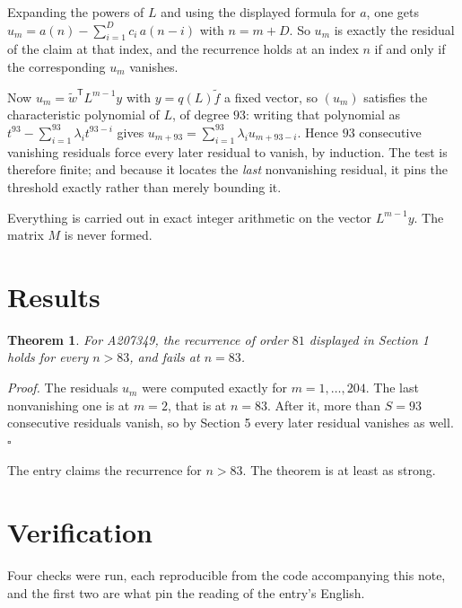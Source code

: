 \documentclass[11pt]{article}
\newtheorem{theorem}{Theorem}
\theoremstyle{definition}
\begin{document}
Expanding the powers of $L$ and using the displayed formula for $a$, one gets $u_m = a(n) - \sum_{i=1}^{D} c_i\,a(n-i)$ with $n = m + D$. So $u_m$ is exactly the residual of the claim at that index, and the recurrence holds at an index $n$ if and only if the corresponding $u_m$ vanishes.

Now $u_m = \tilde w^{\mathsf T} L^{m-1} y$ with $y = q(L)\tilde f$ a fixed vector, so $(u_m)$ satisfies the characteristic polynomial of $L$, of degree $93$: writing that polynomial as $t^{93} - \sum_{i=1}^{93} \lambda_i t^{93-i}$ gives $u_{m+93} = \sum_{i=1}^{93} \lambda_i u_{m+93-i}$. Hence $93$ consecutive vanishing residuals force every later residual to vanish, by induction. The test is therefore finite; and because it locates the {\itshape last} nonvanishing residual, it pins the threshold exactly rather than merely bounding it.

Everything is carried out in exact integer arithmetic on the vector $L^{m-1}y$. The matrix $M$ is never formed.

\section{Results}

\begin{theorem} For A207349, the recurrence of order $81$ displayed in Section 1 holds for every $n > 83$, and fails at $n = 83$.\end{theorem}

{\itshape Proof.} The residuals $u_m$ were computed exactly for $m = 1,\dots,204$. The last nonvanishing one is at $m = 2$, that is at $n = 83$. After it, more than $S = 93$ consecutive residuals vanish, so by Section 5 every later residual vanishes as well. $\square$

The entry claims the recurrence for $n > 83$. The theorem is at least as strong.

\section{Verification}

Four checks were run, each reproducible from the code accompanying this note, and the first two are what pin the reading of the entry's English.
\end{document}
